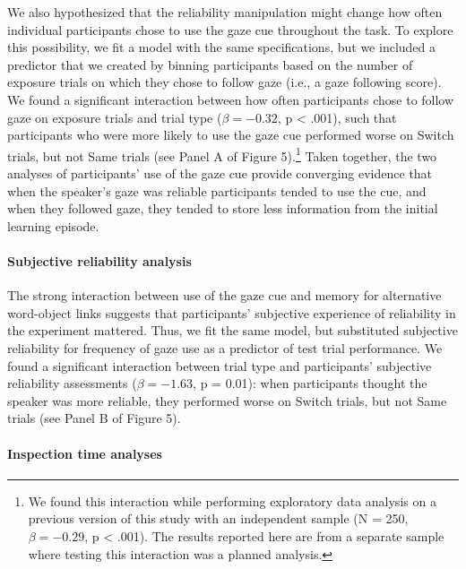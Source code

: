 \documentclass[authoryear, review]{elsarticle}
\begin{document}
We also hypothesized that the reliability manipulation might change how
often individual participants chose to use the gaze cue throughout the
task. To explore this possibility, we fit a model with the same
specifications, but we included a predictor that we created by binning
participants based on the number of exposure trials on which they chose
to follow gaze (i.e., a gaze following score). We found a significant
interaction between how often participants chose to follow gaze on
exposure trials and trial type (\(\beta = -0.32\), p \textless{} .001),
such that participants who were more likely to use the gaze cue
performed worse on Switch trials, but not Same trials (see Panel A of
Figure 5).\footnote{We found this interaction while performing
  exploratory data analysis on a previous version of this study with an
  independent sample (N = 250, \(\beta = -0.29\), p \textless{} .001).
  The results reported here are from a separate sample where testing
  this interaction was a planned analysis.} Taken together, the two
analyses of participants' use of the gaze cue provide converging
evidence that when the speaker's gaze was reliable participants tended
to use the cue, and when they followed gaze, they tended to store less
information from the initial learning episode.

\paragraph{Subjective reliability
analysis}\label{subjective-reliability-analysis}

The strong interaction between use of the gaze cue and memory for
alternative word-object links suggests that participants' subjective
experience of reliability in the experiment mattered. Thus, we fit the
same model, but substituted subjective reliability for frequency of gaze
use as a predictor of test trial performance. We found a significant
interaction between trial type and participants' subjective reliability
assessments (\(\beta = -1.63\), p = 0.01): when participants thought the
speaker was more reliable, they performed worse on Switch trials, but
not Same trials (see Panel B of Figure 5).

\paragraph{Inspection time analyses}\label{inspection-time-analyses}
\end{document}
